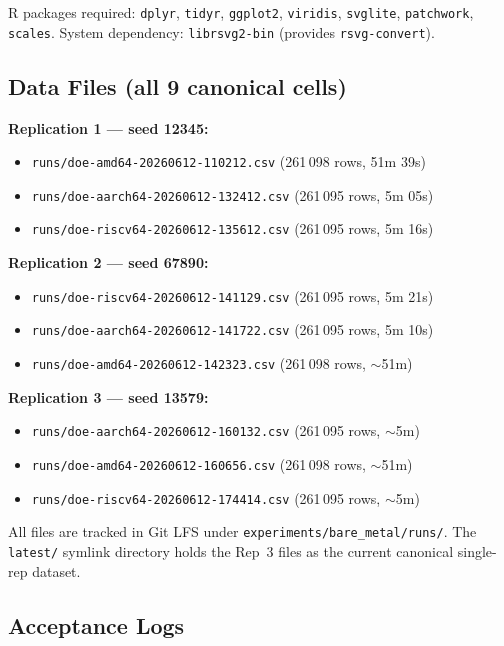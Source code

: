 \documentclass[10pt,a4paper]{article}
\begin{document}
R packages required: \texttt{dplyr}, \texttt{tidyr}, \texttt{ggplot2},
\texttt{viridis}, \texttt{svglite}, \texttt{patchwork}, \texttt{scales}.
System dependency: \texttt{librsvg2-bin} (provides \texttt{rsvg-convert}).

\subsection{Data Files (all 9 canonical cells)}

\noindent\textbf{Replication 1 --- seed 12345:}
\begin{itemize}[noitemsep]
  \item \texttt{runs/doe-amd64-20260612-110212.csv}   \quad (261\,098 rows, 51m 39s)
  \item \texttt{runs/doe-aarch64-20260612-132412.csv} \quad (261\,095 rows,  5m 05s)
  \item \texttt{runs/doe-riscv64-20260612-135612.csv} \quad (261\,095 rows,  5m 16s)
\end{itemize}

\noindent\textbf{Replication 2 --- seed 67890:}
\begin{itemize}[noitemsep]
  \item \texttt{runs/doe-riscv64-20260612-141129.csv} \quad (261\,095 rows,  5m 21s)
  \item \texttt{runs/doe-aarch64-20260612-141722.csv} \quad (261\,095 rows,  5m 10s)
  \item \texttt{runs/doe-amd64-20260612-142323.csv}   \quad (261\,098 rows,    $\sim$51m)
\end{itemize}

\noindent\textbf{Replication 3 --- seed 13579:}
\begin{itemize}[noitemsep]
  \item \texttt{runs/doe-aarch64-20260612-160132.csv} \quad (261\,095 rows,  $\sim$5m)
  \item \texttt{runs/doe-amd64-20260612-160656.csv}   \quad (261\,098 rows,    $\sim$51m)
  \item \texttt{runs/doe-riscv64-20260612-174414.csv} \quad (261\,095 rows,  $\sim$5m)
\end{itemize}

All files are tracked in Git LFS under \texttt{experiments/bare\_metal/runs/}.
The \texttt{latest/} symlink directory holds the Rep~3 files as the current
canonical single-rep dataset.

\subsection{Acceptance Logs}
\end{document}
